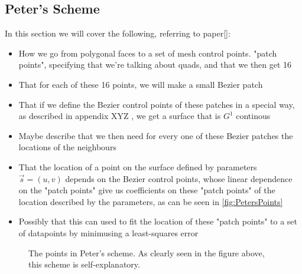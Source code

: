 \subsection{Peter's Scheme}
In this section we will cover the following, referring to paper[]:
\begin{itemize}
\item How we go from polygonal faces to a set of mesh control points. "patch points", specifying that we're talking about quads, and that we then get 16
\item That for each of these 16 points, we will make a small Bezier patch
\item That if we define the Bezier control points of these patches in a special way, as described in appendix XYZ , we get a surface that is $G^1$ continous
\item Maybe describe that we then need for every one of these Bezier patches the locations of the neighbours
\item That the location of a point on the surface defined by parameters $\vec{s} = (u,v)$ depends on the Bezier control points, whose linear dependence on the "patch points" give us coefficients on these "patch points" of the location described by the parameters, as can be seen in \autoref{fig:PetersPoints}
\item Possibly that this can used to fit the location of these "patch points" to a set of datapoints by minimusing a least-squares error 
\end{itemize}
\begin{figure}

\label{fig:PetersPoints}
\caption{The points in Peter's scheme. As clearly seen in the figure above, this scheme is self-explanatory.}
\end{figure}